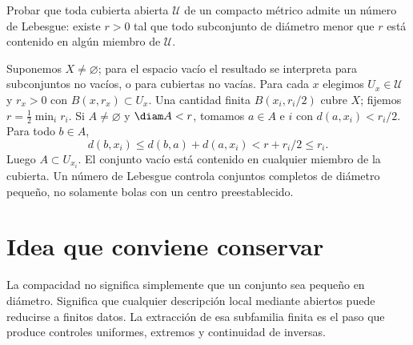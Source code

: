 \begin{ejercicio}
Probar que toda cubierta abierta $\mathcal U$ de un compacto métrico admite un número de Lebesgue: existe $r>0$ tal que todo subconjunto de diámetro menor que $r$ está contenido en algún miembro de $\mathcal U$.
\end{ejercicio}
\begin{solucion}
Suponemos $X\ne\varnothing$; para el espacio vacío el resultado se interpreta para subconjuntos no vacíos, o para cubiertas no vacías. Para cada $x$ elegimos $U_x\in\mathcal U$ y $r_x>0$ con $B(x,r_x)\subset U_x$. Una cantidad finita $B(x_i,r_i/2)$ cubre $X$; fijemos $r=\frac12\min_i r_i$. Si $A\ne\varnothing$ y $\diam A<r$, tomamos $a\in A$ e $i$ con $d(a,x_i)<r_i/2$. Para todo $b\in A$,
\[
d(b,x_i)\le d(b,a)+d(a,x_i)<r+r_i/2\le r_i.
\]
Luego $A\subset U_{x_i}$. El conjunto vacío está contenido en cualquier miembro de la cubierta. Un número de Lebesgue controla conjuntos completos de diámetro pequeño, no solamente bolas con un centro preestablecido.
\end{solucion}

\section{Idea que conviene conservar}
La compacidad no significa simplemente que un conjunto sea pequeño en diámetro. Significa que cualquier descripción local mediante abiertos puede reducirse a finitos datos. La extracción de esa subfamilia finita es el paso que produce controles uniformes, extremos y continuidad de inversas.
